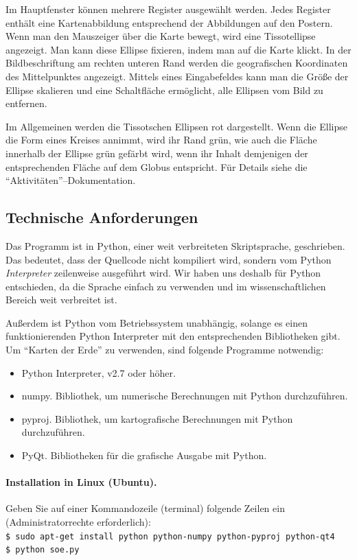 \documentclass[a4paper,12pt]{article}
\begin{document}
Im Hauptfenster können mehrere Register ausgewählt werden. Jedes Register enthält 
eine Kartenabbildung entsprechend der Abbildungen auf den Postern. Wenn man den 
Mauszeiger über die Karte bewegt, wird eine Tissotellipse angezeigt. Man kann 
diese Ellipse fixieren, indem man auf die Karte klickt. In der Bildbeschriftung am 
rechten unteren Rand werden die geografischen Koordinaten des Mittelpunktes angezeigt. 
Mittels eines Eingabefeldes kann man die Größe der Ellipse skalieren und eine 
Schaltfläche ermöglicht, alle Ellipsen vom Bild zu entfernen.

Im Allgemeinen werden die Tissotschen Ellipsen rot dargestellt. Wenn die Ellipse die 
Form eines Kreises annimmt, wird ihr Rand grün, wie auch die Fläche innerhalb der 
Ellipse grün gefärbt wird, wenn ihr Inhalt demjenigen der entsprechenden Fläche auf 
dem Globus entspricht. Für Details siehe die "`Aktivitäten"'--Dokumentation.

\subsection{Technische Anforderungen}
\label{abs-technisches}

Das Programm ist in Python, einer weit verbreiteten Skriptsprache, geschrieben.
Das bedeutet, dass der Quellcode nicht kompiliert wird, sondern vom Python 
\emph{Interpreter} zeilenweise ausgeführt wird. Wir haben uns deshalb für Python
entschieden, da die Sprache einfach zu verwenden und im wissenschaftlichen Bereich
weit verbreitet ist.

Außerdem ist Python vom Betriebssystem unabhängig, solange es einen funktionierenden
Python Interpreter mit den entsprechenden Bibliotheken gibt. Um "`Karten der Erde"' 
zu verwenden, sind folgende Programme notwendig:

\begin{itemize}
 \item Python Interpreter, v2.7 oder höher.
 \item numpy. Bibliothek, um numerische Berechnungen mit Python durchzuführen.
 \item pyproj. Bibliothek, um kartografische Berechnungen mit Python durchzuführen.
 \item PyQt. Bibliotheken für die grafische Ausgabe mit Python.
\end{itemize}

\paragraph{Installation in Linux (Ubuntu).} Geben Sie auf einer Kommandozeile 
           (terminal) folgende Zeilen ein (Administratorrechte erforderlich): \\
\texttt{\$ sudo apt-get install python python-numpy python-pyproj python-qt4} \\
\texttt{\$ python soe.py}
\end{document}

